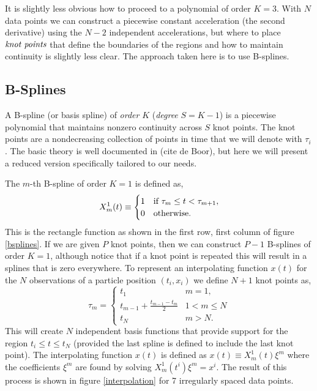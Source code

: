 \documentclass[twocol]{ametsoc}
\begin{document}
It is slightly less obvious how to proceed to a polynomial of order $K=3$. With $N$ data points we can construct a piecewise constant acceleration (the second derivative) using the $N-2$ independent accelerations, but where to place $\emph{knot points}$ that define the boundaries of the regions and how to maintain continuity is slightly less clear. The approach taken here is to use B-splines.

\subsection{B-Splines}

A B-spline (or basis spline) of \emph{order} $K$ (\emph{degree} $S=K-1$) is a piecewise polynomial that maintains nonzero continuity across $S$ knot points. The knot points are a nondecreasing collection of points in time that we will denote with $\tau_i$. The basic theory is well documented in (cite de Boor), but here we will present a reduced version specifically tailored to our needs.

The $m$-th B-spline of order $K=1$ is defined as,
\begin{equation}
X^1_m(t) \equiv \begin{cases}
1      & \text{if $ \tau_m \leq t < \tau_{m+1}$}, \\
0     & \text{otherwise}.
\end{cases}
\end{equation}
This is the rectangle function as shown in the first row, first column of figure \ref{bsplines}. If we are given $P$ knot points, then we can construct $P-1$ B-splines of order $K=1$, although notice that if a knot point is repeated this will result in a splines that is zero everywhere. To represent an interpolating function $x(t)$ for the $N$ observations of a particle position $(t_i,x_i)$ we define $N+1$ knot points as,
\begin{equation}
\tau_m = \begin{cases}
t_1      & \text{$m=1$}, \\
t_{m-1} + \frac{t_{m-1}-t_m}{2}	  & \text{$1<m \leq N$}\\
t_N     & \text{$m>N$}.
\end{cases}
\end{equation}
This will create $N$ independent basis functions that provide support for the region $t_i \leq t \leq t_N$ (provided the last spline is defined to include the last knot point). The interpolating function $x(t)$ is defined as $x(t) \equiv  X^1_m(t) \xi^m$ where the coefficients $\xi^m$ are found by solving $X^1_m(t^i) \xi^m = x^i$. The result of this process is shown in figure \ref{interpolation} for 7 irregularly spaced data points.
\end{document}
